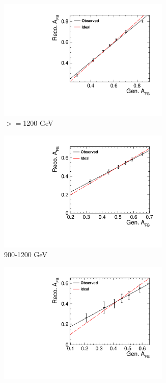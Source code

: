 \begin{figure}
  \centering
  \begin{subfigure}{.6\textwidth}
    \centering
    \includegraphics[width=0.9\textwidth]{TopAnalysis/figures/BiasHighE.pdf}
    \caption{$>=$1200 GeV}
  \end{subfigure}
  \begin{subfigure}{.6\textwidth}
    \centering
    \includegraphics[width=0.9\textwidth]{TopAnalysis/figures/BiasMidE.pdf}
    \caption{900-1200 GeV}
  \end{subfigure}
  \begin{subfigure}{.6\textwidth}
    \centering
    \includegraphics[width=0.9\textwidth]{TopAnalysis/figures/BiasLowE.pdf}

\end{subfigure}
\end{figure}
